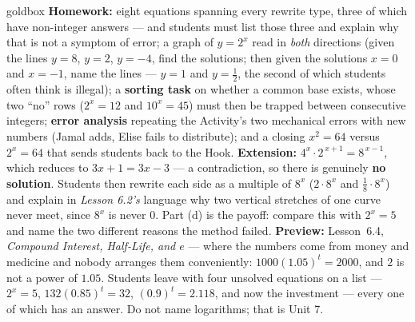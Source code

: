 \documentclass[10pt]{article}
\begin{document}
\begin{skillbox}{goldbox}
\textbf{Homework:} eight equations spanning every rewrite type, three of which have non-integer answers
--- and students must list those three and explain why that is not a symptom of error; a graph of
$y=2^{x}$ read in \emph{both} directions (given the lines $y=8$, $y=2$, $y=-4$, find the solutions;
then given the solutions $x=0$ and $x=-1$, name the lines --- $y=1$ and $y=\frac12$, the second of
which students often think is illegal); a \textbf{sorting task} on whether a common base exists, whose
two ``no'' rows ($2^{x}=12$ and $10^{x}=45$) must then be trapped between consecutive integers;
\textbf{error analysis} repeating the Activity's two mechanical errors with new numbers (Jamal adds,
Elise fails to distribute); and a closing $x^{2}=64$ versus $2^{x}=64$ that sends students back to the
Hook. \textbf{Extension:} $4^{x}\cdot2^{\,x+1}=8^{\,x-1}$, which reduces to $3x+1=3x-3$ --- a
contradiction, so there is genuinely \textbf{no solution}. Students then rewrite each side as a
multiple of $8^{x}$ ($2\cdot8^{x}$ and $\frac18\cdot8^{x}$) and explain in \emph{Lesson 6.2's} language
why two vertical stretches of one curve never meet, since $8^{x}$ is never $0$. Part (d) is the payoff:
compare this with $2^{x}=5$ and name the two different reasons the method failed. \textbf{Preview:}
Lesson~6.4, \emph{Compound Interest, Half-Life, and $e$} --- where the numbers come from money and
medicine and nobody arranges them conveniently: $1000(1.05)^{t}=2000$, and $2$ is not a power of
$1.05$. Students leave with four unsolved equations on a list --- $2^{x}=5$, $132(0.85)^{t}=32$,
$(0.9)^{t}=2.118$, and now the investment --- every one of which has an answer. Do not name logarithms;
that is Unit 7.
\end{skillbox}
\end{document}
